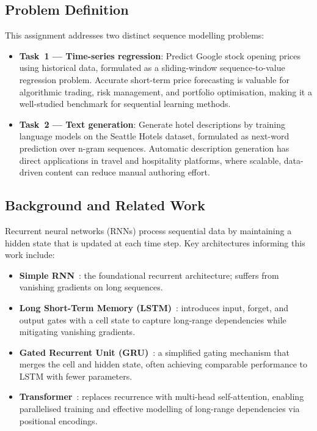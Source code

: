 \documentclass[11pt,letterpaper]{article}
\begin{document}
\subsection{Problem Definition}

This assignment addresses two distinct sequence modelling problems:
\begin{itemize}[noitemsep]
  \item \textbf{Task~1 --- Time-series regression}: Predict Google stock opening
        prices using historical data, formulated as a sliding-window sequence-to-value
        regression problem.
        Accurate short-term price forecasting is valuable for algorithmic trading,
        risk management, and portfolio optimisation, making it a well-studied
        benchmark for sequential learning methods.
  \item \textbf{Task~2 --- Text generation}: Generate hotel descriptions by training
        language models on the Seattle Hotels dataset, formulated as next-word
        prediction over n-gram sequences.
        Automatic description generation has direct applications in travel and
        hospitality platforms, where scalable, data-driven content can reduce
        manual authoring effort.
\end{itemize}

\subsection{Background and Related Work}

Recurrent neural networks (RNNs) process sequential data by maintaining a hidden
state that is updated at each time step.
Key architectures informing this work include:

\begin{itemize}[noitemsep]
  \item \textbf{Simple RNN}~\cite{elman1990finding}: the foundational recurrent
        architecture; suffers from vanishing gradients on long sequences.
  \item \textbf{Long Short-Term Memory (LSTM)}~\cite{hochreiter1997long}: introduces
        input, forget, and output gates with a cell state to capture long-range
        dependencies while mitigating vanishing gradients.
  \item \textbf{Gated Recurrent Unit (GRU)}~\cite{cho2014learning}: a simplified
        gating mechanism that merges the cell and hidden state, often achieving
        comparable performance to LSTM with fewer parameters.
  \item \textbf{Transformer}~\cite{vaswani2017attention}: replaces recurrence with
        multi-head self-attention, enabling parallelised training and effective
        modelling of long-range dependencies via positional encodings.
\end{itemize}
\end{document}
